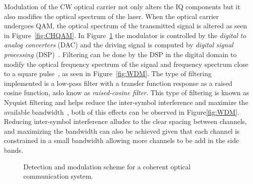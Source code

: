 Modulation of the CW optical carrier not only alters the IQ components but it also modifies the optical spectrum of the laser. When  the optical carrier undergoes QAM, the optical spectrum of the transmitted signal is altered as seen in Figure~\ref{fig:CHQAM}. In Figure~\ref{fig:DetMod} the modulator is controlled  by the \textit{digital to analog converters } (DAC) and the driving signal is computed by \textit{digital signal processing} (DSP)~\cite{kikuchi2015fundamentals}. Filtering can be done by the DSP in the digital domain to modify the optical frequency spectrum of the signal and frequency spectrum close to a square pulse~\cite{kikuchi2015fundamentals,FiberAgrawal}, as seen in Figure~\ref{fig:WDM}. The type of filtering implemented is a low-pass filter with a transfer function response as a raised cosine function, aslo know as \textit{raised-cosine filter}. This type of filtering is known as Nyquist filtering and helps reduce the inter-symbol interference and maximize the available bandwidth~\cite{zou2016spectrally}, both of this effects can be observed in  Figure\ref{fig:WDM}. Reducing inter-symbol interference alludes to the clear spacing between channels, and maximizing the bandwidth can also be achieved given that each channel is constrained in a small bandwidth allowing more channels to be add in the side bands.

\begin{figure}[h!]
 \centering
{}
  \qquad
  \caption{Detection and modulation scheme for a coherent optical communication system. }
  \label{fig:DetMod}
\end{figure}


